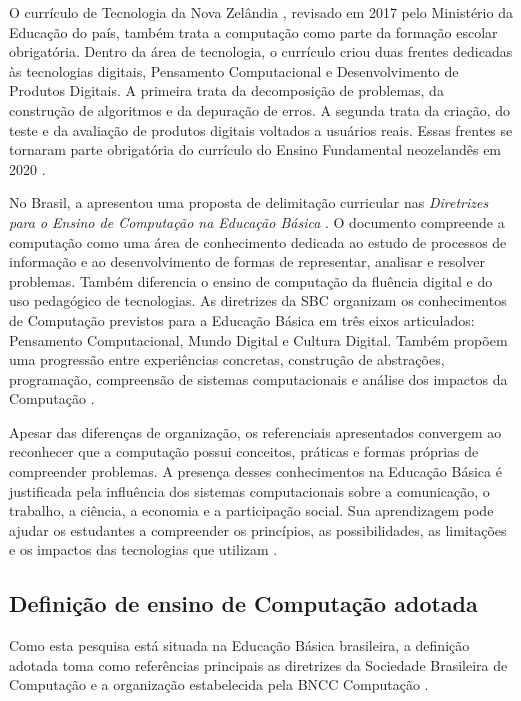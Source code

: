 O currículo de Tecnologia da Nova Zelândia \cite{NewZealandMoE2017}, revisado em 2017 pelo Ministério da Educação do país, também trata a computação como parte da formação escolar obrigatória. Dentro da área de tecnologia, o currículo criou duas frentes dedicadas às tecnologias digitais, Pensamento Computacional e Desenvolvimento de Produtos Digitais. A primeira trata da decomposição de problemas, da construção de algoritmos e da depuração de erros. A segunda trata da criação, do teste e da avaliação de produtos digitais voltados a usuários reais. Essas frentes se tornaram parte obrigatória do currículo do Ensino Fundamental neozelandês em 2020 \cite{NewZealandMoE2017}.

No Brasil, a  apresentou uma proposta de delimitação curricular nas \textit{Diretrizes para o Ensino de Computação na Educação Básica} \cite{ribeiro2019diretrizes}. O documento compreende a computação como uma área de conhecimento dedicada ao estudo de processos de informação e ao desenvolvimento de formas de representar, analisar e resolver problemas. Também diferencia o ensino de computação da fluência digital e do uso pedagógico de tecnologias. As diretrizes da SBC organizam os conhecimentos de Computação previstos para a Educação Básica em três eixos articulados: Pensamento Computacional, Mundo Digital e Cultura Digital. Também propõem uma progressão entre experiências concretas, construção de abstrações, programação, compreensão de sistemas computacionais e análise dos impactos da Computação \cite{ribeiro2019diretrizes}.

Apesar das diferenças de organização, os referenciais apresentados convergem ao reconhecer que a computação possui conceitos, práticas e formas próprias de compreender problemas. A presença desses conhecimentos na Educação Básica é justificada pela influência dos sistemas computacionais sobre a comunicação, o trabalho, a ciência, a economia e a participação social. Sua aprendizagem pode ajudar os estudantes a compreender os princípios, as possibilidades, as limitações e os impactos das tecnologias que utilizam \cite{caspersen2019informatics,royal2012shut}.

\subsection{Definição de ensino de Computação adotada}
\label{subsec:definicao-computacao-pesquisa}

Como esta pesquisa está situada na Educação Básica brasileira, a definição adotada toma como referências principais as diretrizes da Sociedade Brasileira de Computação \cite{ribeiro2019diretrizes} e a organização estabelecida pela BNCC Computação \cite{brasil2022bncccomputacao}.


